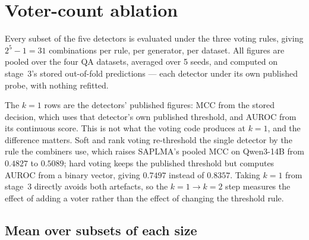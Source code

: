 \section{Voter-count ablation}
\label{sec:appendix:voters}

Every subset of the five detectors is evaluated under the three voting rules, giving
$2^5-1 = 31$ combinations per rule, per generator, per dataset. All figures are pooled over
the four QA datasets, averaged over 5 seeds, and computed on stage~3's stored out-of-fold
predictions --- each detector under its own published probe, with nothing refitted.

The $k{=}1$ rows are the detectors' published figures: MCC from the stored decision, which
uses that detector's own published threshold, and AUROC from its continuous score. This is
not what the voting code produces at $k{=}1$, and the difference matters. Soft and rank
voting re-threshold the single detector by the rule the combiners use, which raises
SAPLMA's pooled MCC on Qwen3-14B from $0.4827$ to $0.5089$; hard voting keeps the published
threshold but computes AUROC from a binary vector, giving $0.7497$ instead of $0.8357$.
Taking $k{=}1$ from stage~3 directly avoids both artefacts, so the $k{=}1 \rightarrow k{=}2$
step measures the effect of adding a voter rather than the effect of changing the threshold
rule.

\subsection{Mean over subsets of each size}

